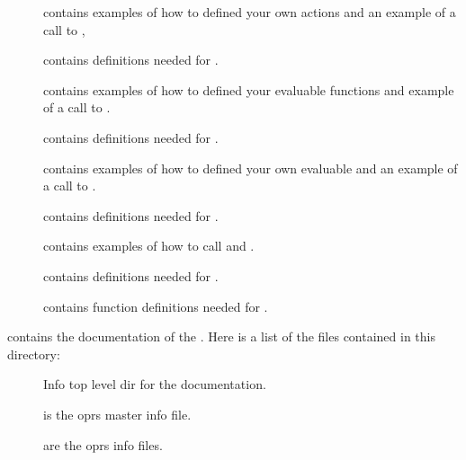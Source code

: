\begin{description}
\begin{description}

\item [] contains examples of how to defined your own
actions and an example of a call to ,

\item [] contains definitions needed for .

\item [] contains examples of how to defined your
evaluable functions and example of a call to .

\item [] contains definitions needed for .

\item [] contains examples of how to defined your own
evaluable  and an example of a call to .

\item [] contains definitions needed for .

\item [] contains examples of how to call
 and .

\item [] contains definitions needed for .

\item [] contains function definitions needed for
.

\end{description}

\item [\file{doc}] contains the documentation of the \COPRSDE{}. Here is a
list of the files contained in this directory:

\begin{description}

\item [] Info top level dir for the documentation.

\item [] is the oprs master info file.

\item [] are the oprs info files.


\end{description}
\end{description}
